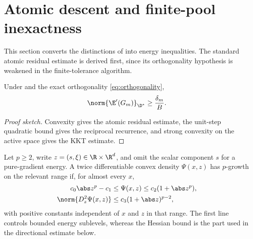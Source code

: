 \section{Atomic descent and finite-pool inexactness}
\label{sec:descent}

This section converts the distinctions of  into energy inequalities. The standard
atomic residual estimate is derived first, since its orthogonality hypothesis is weakened in the
finite-tolerance algorithm.

\begin{lemma}
\label{lem:atomic-residual}
Under  and the exact orthogonality \cref{eq:orthogonality},
\begin{equation}
  \norm{\E'(G_m)}_{\D^*}\geq \frac{\delta_m}{B}.
\label{eq:atomic-residual}
\end{equation}
\end{lemma}

\begin{proof}[Proof sketch]
Convexity gives the atomic residual estimate, the unit-step quadratic bound gives the reciprocal recurrence, and strong convexity on the active space gives the KKT estimate.
\end{proof}

\begin{definition}
\label{def:p-growth}
Let \(p\geq2\), write \(z=(s,\xi)\in\R\times\R^d\), and omit the scalar component \(s\) for a
pure-gradient energy. A twice differentiable convex density \(\Psi(x,z)\) has \(p\)-growth on the
relevant range if, for almost every \(x\),
\begin{align*}
 c_0\abs z^p-c_1&\leq \Psi(x,z)\leq c_2(1+\abs z^p),\\
 \norm{D_z^2\Psi(x,z)}&\leq c_3(1+\abs z)^{p-2},
\end{align*}
with positive constants independent of \(x\) and \(z\) in that range. The first line controls bounded
energy sublevels, whereas the Hessian bound is the part used in the directional estimate below.
\end{definition}


